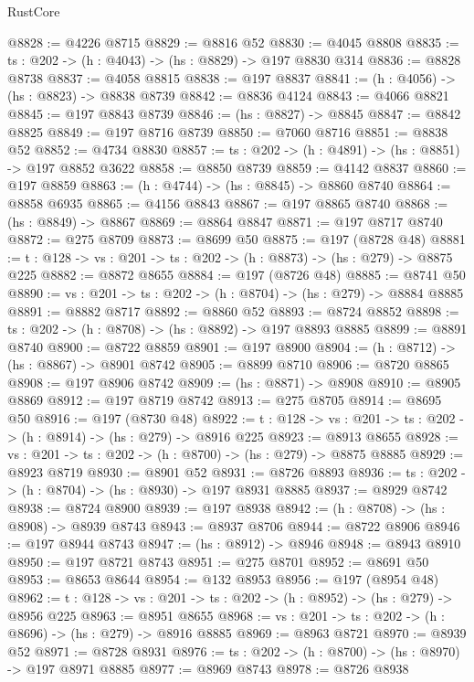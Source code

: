 \begin{lexlean}{RustCore}
\begin{coremodule}
@8828 := @4226 @8715
@8829 := @8816 @52
@8830 := @4045 @8808
@8835 := {ts : @202} -> (h : @4043) -> (hs : @8829) -> @197 @8830 @314
@8836 := @8828 @8738
@8837 := @4058 @8815
@8838 := @197 @8837
@8841 := (h : @4056) -> (hs : @8823) -> @8838 @8739
@8842 := @8836 @4124
@8843 := @4066 @8821
@8845 := @197 @8843 @8739
@8846 := (hs : @8827) -> @8845
@8847 := @8842 @8825
@8849 := @197 @8716 @8739
@8850 := @7060 @8716
@8851 := @8838 @52
@8852 := @4734 @8830
@8857 := {ts : @202} -> (h : @4891) -> (hs : @8851) -> @197 @8852 @3622
@8858 := @8850 @8739
@8859 := @4142 @8837
@8860 := @197 @8859
@8863 := (h : @4744) -> (hs : @8845) -> @8860 @8740
@8864 := @8858 @6935
@8865 := @4156 @8843
@8867 := @197 @8865 @8740
@8868 := (hs : @8849) -> @8867
@8869 := @8864 @8847
@8871 := @197 @8717 @8740
@8872 := @275 @8709
@8873 := @8699 @50
@8875 := @197 (@8728 @48)
@8881 := {t : @128} -> {vs : @201} -> {ts : @202} -> (h : @8873) -> (hs : @279) -> @8875 @225
@8882 := @8872 @8655
@8884 := @197 (@8726 @48)
@8885 := @8741 @50
@8890 := {vs : @201} -> {ts : @202} -> (h : @8704) -> (hs : @279) -> @8884 @8885
@8891 := @8882 @8717
@8892 := @8860 @52
@8893 := @8724 @8852
@8898 := {ts : @202} -> (h : @8708) -> (hs : @8892) -> @197 @8893 @8885
@8899 := @8891 @8740
@8900 := @8722 @8859
@8901 := @197 @8900
@8904 := (h : @8712) -> (hs : @8867) -> @8901 @8742
@8905 := @8899 @8710
@8906 := @8720 @8865
@8908 := @197 @8906 @8742
@8909 := (hs : @8871) -> @8908
@8910 := @8905 @8869
@8912 := @197 @8719 @8742
@8913 := @275 @8705
@8914 := @8695 @50
@8916 := @197 (@8730 @48)
@8922 := {t : @128} -> {vs : @201} -> {ts : @202} -> (h : @8914) -> (hs : @279) -> @8916 @225
@8923 := @8913 @8655
@8928 := {vs : @201} -> {ts : @202} -> (h : @8700) -> (hs : @279) -> @8875 @8885
@8929 := @8923 @8719
@8930 := @8901 @52
@8931 := @8726 @8893
@8936 := {ts : @202} -> (h : @8704) -> (hs : @8930) -> @197 @8931 @8885
@8937 := @8929 @8742
@8938 := @8724 @8900
@8939 := @197 @8938
@8942 := (h : @8708) -> (hs : @8908) -> @8939 @8743
@8943 := @8937 @8706
@8944 := @8722 @8906
@8946 := @197 @8944 @8743
@8947 := (hs : @8912) -> @8946
@8948 := @8943 @8910
@8950 := @197 @8721 @8743
@8951 := @275 @8701
@8952 := @8691 @50
@8953 := @8653 @8644
@8954 := @132 @8953
@8956 := @197 (@8954 @48)
@8962 := {t : @128} -> {vs : @201} -> {ts : @202} -> (h : @8952) -> (hs : @279) -> @8956 @225
@8963 := @8951 @8655
@8968 := {vs : @201} -> {ts : @202} -> (h : @8696) -> (hs : @279) -> @8916 @8885
@8969 := @8963 @8721
@8970 := @8939 @52
@8971 := @8728 @8931
@8976 := {ts : @202} -> (h : @8700) -> (hs : @8970) -> @197 @8971 @8885
@8977 := @8969 @8743
@8978 := @8726 @8938

\end{coremodule}
\end{lexlean}
